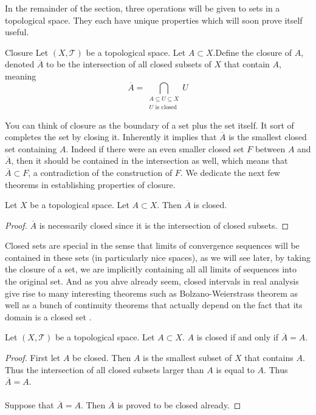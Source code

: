 In the remainder of the section, three operations will be given to sets in a topological space. They each have unique properties which will soon prove itself useful. 

\begin{defn}{Closure}{} Let $(X,\mathcal{T})$ be a topological space. Let $A\subset X$.Define the closure of $A$, denoted $\overline{A}$ to be the intersection of all closed subsets of $X$ that contain $A$, meaning $$\overline{A}=\bigcap_{\substack{A\subseteq U\subseteq X\\U\text{ is closed}}}U$$
\end{defn}

You can think of closure as the boundary of a set plus the set itself.  It sort of completes the set by closing it. Inherently it implies that $\overline{A}$ is the smallest closed set containing $A$. Indeed if there were an even smaller closed set $F$ between $A$ and $\overline{A}$, then it should be contained in the intersection as well, which means that $\overline{A}\subset F$, a contradiction of the construction of $F$. We dedicate the next few theorems in establishing properties of closure. 

\begin{lmm}{}{} Let $X$ be a topological space. Let $A\subset X$. Then $\overline{A}$ is closed. \tcbline
\begin{proof}
$\overline{A}$ is necessarily closed since it is the intersection of closed subsets. 
\end{proof}
\end{lmm}

Closed sets are special in the sense that limits of convergence sequences will be contained in these sets (in particularly nice spaces), as we will see later, by taking the closure of a set, we are implicitly containing all all limits of sequences into the original set. And as you ahve already seem, closed intervals in real analysis give rise to many interesting theorems such as Bolzano-Weierstrass theorem as well as a bunch of continuity theorems that actually depend on the fact that its domain is a closed set . 

\begin{prp}{}{} Let $(X,\mathcal{T})$ be a topological space. Let $A\subset X$. $A$ is closed if and only if $\overline{A}=A$. \tcbline
\begin{proof}
First let $A$ be closed. Then $A$ is the smallest subset of $X$ that contains $A$. Thus the intersection of all closed subsets larger than $A$ is equal to $A$. Thus $\overline{A}=A$. \\~\\
Suppose that $\overline{A}=A$. Then $\overline{A}$ is proved to be closed already. 
\end{proof}
\end{prp}

